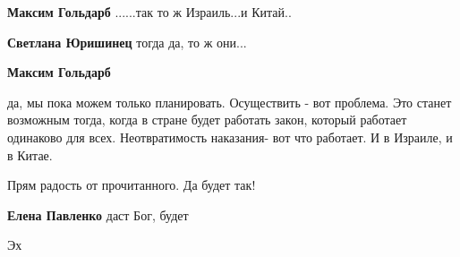 \begin{itemize}
\begin{itemize}
\textbf{Максим Гольдарб} ......так то ж Израиль...и Китай..

 
\textbf{Светлана Юришинец} тогда да, то ж они...

 
\textbf{Максим Гольдарб} 

да, мы пока можем только планировать. Осуществить - вот проблема. Это станет
возможным тогда, когда в стране будет работать закон, который работает
одинаково для всех. Неотвратимость наказания- вот что работает. И в Израиле, и
в Китае.

\end{itemize}

 
Прям радость от прочитанного. Да будет так!

\begin{itemize}
 
\textbf{Елена Павленко} даст Бог, будет
\end{itemize}

 
Эх

\begin{itemize}
 

\end{itemize}
\end{itemize}
